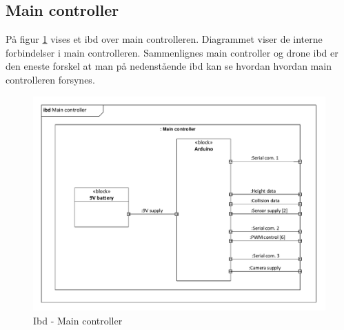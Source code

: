 \subsection{Main controller}

På figur \ref{fig:ibd_maincontroller} vises et ibd over main controlleren. Diagrammet viser de interne forbindelser i main controlleren. Sammenlignes main controller og drone ibd er den eneste forskel at man på nedenstående ibd kan se hvordan hvordan main controlleren forsynes.  

\begin{figure}[H]
\centering
\includegraphics[width=1\textwidth]{Billeder/IBD/ibd3_maincontroller.pdf}
\vspace{-1cm}
\caption{Ibd - Main controller}
\label{fig:ibd_maincontroller}
\end{figure}

